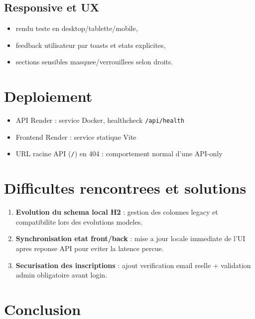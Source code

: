 \documentclass[11pt,a4paper]{article}
\begin{document}
\subsection{Responsive et UX}
\begin{itemize}
  \item rendu teste en desktop/tablette/mobile,
  \item feedback utilisateur par toasts et etats explicites,
  \item sections sensibles masquee/verrouillees selon droits.
\end{itemize}

\section{Deploiement}

\begin{itemize}
  \item API Render : service Docker, healthcheck \texttt{/api/health}
  \item Frontend Render : service statique Vite
  \item URL racine API (\texttt{/}) en 404 : comportement normal d'une API-only
\end{itemize}

\section{Difficultes rencontrees et solutions}

\begin{enumerate}
  \item \textbf{Evolution du schema local H2} :
  gestion des colonnes legacy et compatibilite lors des evolutions modeles.

  \item \textbf{Synchronisation etat front/back} :
  mise a jour locale immediate de l'UI apres reponse API pour eviter la latence percue.

  \item \textbf{Securisation des inscriptions} :
  ajout verification email reelle + validation admin obligatoire avant login.
\end{enumerate}

\section{Conclusion}
\end{document}
